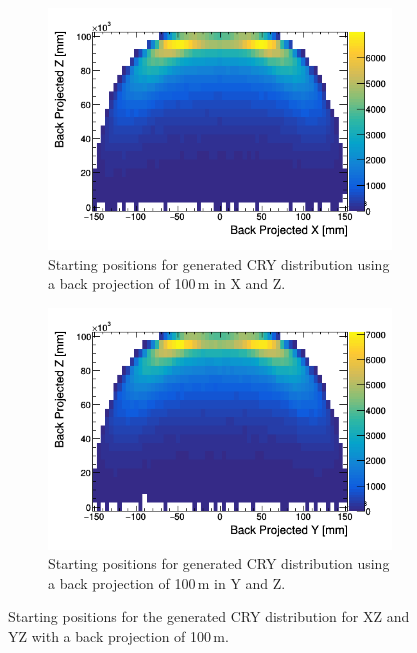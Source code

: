 \begin{figure}[htbp]
\centering
\begin{subfigure}{.5\textwidth}
  \centering
  \includegraphics[width=\linewidth]{Chapter4/Figs/Raster/CryPlots/BackProjectionXZ.png}
  \captionsetup{width=.9\linewidth}
  \caption{Starting positions for generated CRY distribution using a back projection of 100\,m in X and Z.}
  \label{subFig:BackProjectionXZ}
\end{subfigure}%
\begin{subfigure}{.5\textwidth}
  \centering
  \includegraphics[width=\linewidth]{Chapter4/Figs/Raster/CryPlots/BackProjectionYZ.png}
  \captionsetup{width=.9\linewidth}
  \caption{Starting positions for generated CRY distribution using a back projection of 100\,m in Y and Z.}
  \label{subFig:BackProjectionYZ}
\end{subfigure}
\caption{Starting positions for the generated CRY distribution for XZ and YZ with a back projection of 100\,m.}
\label{fig:BackProjection_XZ_YZ}
\end{figure}

